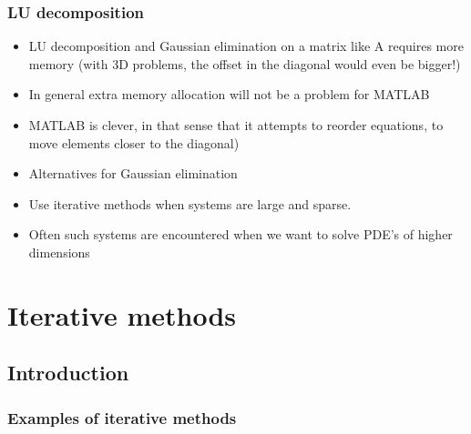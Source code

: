 \documentclass[11pt,table,final,xcolor={usenames,dvipsnames,table}]{beamer}
\begin{document}
\begin{frame}[fragile]
  \frametitle{LU decomposition}
  \begin{itemize}
    \item LU decomposition and Gaussian elimination on a matrix like A requires more memory (with 3D problems, the offset in the diagonal would even be bigger!)
    \item In general extra memory allocation will not be a problem for MATLAB
    \item MATLAB is clever, in that sense that it attempts to reorder equations, to move elements closer to the diagonal)
    \item Alternatives for Gaussian elimination
    \item Use iterative methods when systems are large and sparse.
    \item Often such systems are encountered when we want to solve PDE’s of higher dimensions
  \end{itemize}
\end{frame}

\section{Iterative methods}
\subsection*{Introduction}

\begin{frame}[fragile]
  \frametitle{Examples of iterative methods}
\end{frame}
\end{document}
